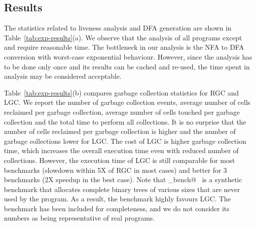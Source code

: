 \documentclass[9pt]{sigplanconf}
\begin{document}




\subsection{Results}

The statistics  related to  liveness analysis  and DFA  generation are
shown in Table~\ref{tab:exp-results}(a). We  observe that the analysis
of  all  programs  except \verb@treejoin@  and  \verb@sudoku@  require
reasonable time.   The bottleneck in  our analysis  is the NFA  to DFA
conversion with  worst-case exponential behaviour. However,  since the
analysis has  to be  done only  once and its  results can be cached and
re-used, the time spent in analysis may be considered acceptable.


Table~\ref{tab:exp-results}(b) compares  garbage collection statistics
for RGC and  LGC.  We report the number of  garbage collection events,
average  number of  cells  reclaimed per  garbage collection,  average
number of cells  touched per garbage collection and the  total time to
perform all collections.   It is no surprise that the  number of cells
reclaimed per garbage  collection is higher and the  number of garbage
collections  lower  for  LGC.   The  cost of  LGC  is  higher  garbage
collection time, which increases the  overall execution time even with
reduced number of  collections.  However, the execution time  of LGC is
still comparable for most benchmarks (slowdown within 5X of
RGC in most cases) and better  for 3 benchmarks (2X speedup in the
best case).  Note that  \verb@gc_bench@~\cite{gc_bench} is a synthetic
benchmark that allocates complete binary
trees  of various  sizes that  are  never used  by the  program. As  a
result,  the benchmark  highly favours  LGC.  The  benchmark has  been
included  for  completeness,  and  we  do  not  consider  its  numbers
as being representative of real programs.
\end{document}
